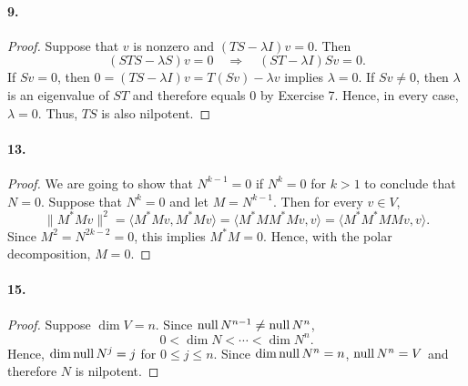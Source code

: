   \paragraph{9.}
  \begin{proof}
    Suppose that $v$ is nonzero and $(TS-\lambda I)v=0$. Then 
    \[
      (STS-\lambda S)v=0 \quad\Rightarrow\quad
      (ST-\lambda I)Sv=0.
    \]
    If $Sv=0$, then $0=(TS-\lambda I)v=T(Sv)-\lambda v$ implies $\lambda=0$. If
    $Sv\ne 0$, then $\lambda$ is an eigenvalue of $ST$ and therefore equals $0$
    by Exercise 7. Hence, in every case, $\lambda=0$. Thus, $TS$ is also 
    nilpotent.
  \end{proof}

  \paragraph{13.}
  \begin{proof}
    We are going to show that $N^{k-1}=0$ if $N^k=0$ for $k>1$ to conclude that 
    $N=0$. Suppose that $N^k=0$ and let $M=N^{k-1}$. Then for every $v\in V$,
    \[
      \|M^*Mv\|^2 = \langle M^*Mv, M^*Mv\rangle
      = \langle M^*MM^*Mv,v\rangle = \langle M^*M^*MMv,v\rangle.
    \]
    Since $M^2=N^{2k-2}=0$, this implies $M^*M=0$. Hence, with the polar 
    decomposition, $M=0$.
  \end{proof}

  \paragraph{15.}
  \begin{proof}
    Suppose $\dim V=n$. Since $\operatorname{null} N^{n-1}\ne\operatorname{null} N^n$,
    \[
      0<\dim N < \cdots < \dim N^n.
    \]
    Hence, $\dim\operatorname{null} N^j=j$ for $0\le j\le n$. Since $\dim\operatorname{null} N^n=n$, $\operatorname{null} N^n
    =V$ and therefore $N$ is nilpotent.
  \end{proof}

